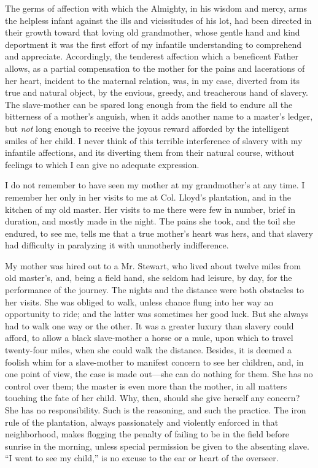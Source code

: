 {\protect\hypertarget{53}{}{}}The germs of affection with which the
Almighty, in his wisdom and mercy, arms the helpless infant against the
ills and vicissitudes of his lot, had been directed in their growth
toward that loving old grandmother, whose gentle hand and kind
deportment it was the first effort of my infantile understanding to
comprehend and appreciate. Accordingly, the tenderest affection which a
beneficent Father allows, as a partial compensation to the mother for
the pains and lacerations of her heart, incident to the maternal
relation, was, in my case, diverted from its true and natural object, by
the envious, greedy, and treacherous hand of slavery. The slave-mother
can be spared long enough from the field to endure all the bitterness of
a mother's anguish, when it adds another name to a master's ledger, but
\emph{not} long enough to receive the joyous reward afforded by the
intelligent smiles of her child. I never think of this terrible
interference of slavery with my infantile affections, and its diverting
them from their natural course, without feelings to which I can give no
adequate expression.

I do not remember to have seen my mother at my grandmother's at any
time. I remember her only in her visits to me at Col. Lloyd's
plantation, and in the kitchen of my old master. Her visits to me there
were few in number, brief in duration, and mostly made in the night. The
pains she took, and the toil she endured, to see me, tells me that a
true mother's heart was hers, and that slavery had difficulty in
paralyzing it with unmotherly indifference.

My mother was hired out to a Mr. Stewart, who lived about twelve miles
from old master's, and, {\protect\hypertarget{54}{}{}}being a field
hand, she seldom had leisure, by day, for the performance of the
journey. The nights and the distance were both obstacles to her visits.
She was obliged to walk, unless chance flung into her way an opportunity
to ride; and the latter was sometimes her good luck. But she always had
to walk one way or the other. It was a greater luxury than slavery could
afford, to allow a black slave-mother a horse or a mule, upon which to
travel twenty-four miles, when she could walk the distance. Besides, it
is deemed a foolish whim for a slave-mother to manifest concern to see
her children, and, in one point of view, the case is made out---she can
do nothing for them. She has no control over them; the master is even
more than the mother, in all matters touching the fate of her child.
Why, then, should she give herself any concern? She has no
responsibility. Such is the reasoning, and such the practice. The iron
rule of the plantation, always passionately and violently enforced in
that neighborhood, makes flogging the penalty of failing to be in the
field before sunrise in the morning, unless special permission be given
to the absenting slave. ``I went to see my child,'' is no excuse to the
ear or heart of the overseer.

